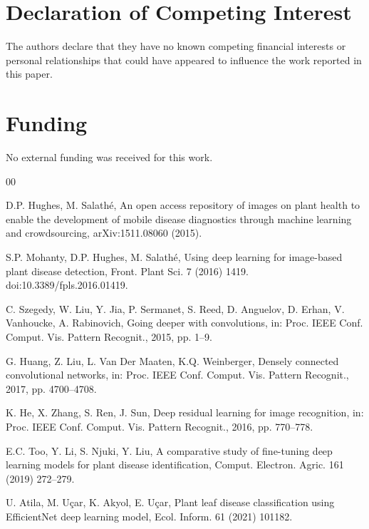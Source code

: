 \documentclass[a4paper,fleqn]{cas-dc}
\begin{document}
\section*{Declaration of Competing Interest}
The authors declare that they have no known competing financial interests or personal relationships that could have appeared to influence the work reported in this paper.

\section*{Funding}
No external funding was received for this work.


\begin{thebibliography}{00}

D.P. Hughes, M. Salathé, An open access repository of images on plant health to enable the development of mobile disease diagnostics through machine learning and crowdsourcing, arXiv:1511.08060 (2015).

S.P. Mohanty, D.P. Hughes, M. Salathé, Using deep learning for image-based plant disease detection, Front. Plant Sci. 7 (2016) 1419. doi:10.3389/fpls.2016.01419.

C. Szegedy, W. Liu, Y. Jia, P. Sermanet, S. Reed, D. Anguelov, D. Erhan, V. Vanhoucke, A. Rabinovich, Going deeper with convolutions, in: Proc. IEEE Conf. Comput. Vis. Pattern Recognit., 2015, pp. 1--9.

G. Huang, Z. Liu, L. Van Der Maaten, K.Q. Weinberger, Densely connected convolutional networks, in: Proc. IEEE Conf. Comput. Vis. Pattern Recognit., 2017, pp. 4700--4708.

K. He, X. Zhang, S. Ren, J. Sun, Deep residual learning for image recognition, in: Proc. IEEE Conf. Comput. Vis. Pattern Recognit., 2016, pp. 770--778.

E.C. Too, Y. Li, S. Njuki, Y. Liu, A comparative study of fine-tuning deep learning models for plant disease identification, Comput. Electron. Agric. 161 (2019) 272--279.

U. Atila, M. Uçar, K. Akyol, E. Uçar, Plant leaf disease classification using EfficientNet deep learning model, Ecol. Inform. 61 (2021) 101182.


\end{thebibliography}
\end{document}
